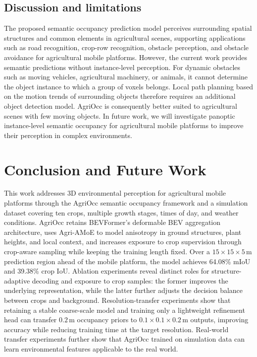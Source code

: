 \documentclass[a4paper,fleqn]{cas-sc}
\begin{document}
\subsection{Discussion and limitations}\label{sec:discussion}
The proposed semantic occupancy prediction model perceives surrounding spatial structures and common elements in agricultural scenes, supporting applications such as road recognition, crop-row recognition, obstacle perception, and obstacle avoidance for agricultural mobile platforms.
However, the current work provides semantic predictions without instance-level perception. For dynamic obstacles such as moving vehicles, agricultural machinery, or animals, it cannot determine the object instance to which a group of voxels belongs.
Local path planning based on the motion trends of surrounding objects therefore requires an additional object detection model.
AgriOcc is consequently better suited to agricultural scenes with few moving objects.
In future work, we will investigate panoptic instance-level semantic occupancy for agricultural mobile platforms to improve their perception in complex environments.

\section{Conclusion and Future Work}\label{sec:conclusion}
This work addresses 3D environmental perception for agricultural mobile platforms through the AgriOcc semantic occupancy framework and a simulation dataset covering ten crops, multiple growth stages, times of day, and weather conditions.
AgriOcc retains BEVFormer's deformable BEV aggregation architecture, uses Agri-AMoE to model anisotropy in ground structures, plant heights, and local context, and increases exposure to crop supervision through crop-aware sampling while keeping the training length fixed.
Over a $15\times15\times5\,\mathrm{m}$ prediction region ahead of the mobile platform, the model achieves 64.08\% mIoU and 39.38\% crop IoU.
Ablation experiments reveal distinct roles for structure-adaptive decoding and exposure to crop samples: the former improves the underlying representation, while the latter further adjusts the decision balance between crops and background.
Resolution-transfer experiments show that retaining a stable coarse-scale model and training only a lightweight refinement head can transfer $0.2\,\mathrm{m}$ occupancy priors to $0.1\times0.1\times0.2\,\mathrm{m}$ outputs, improving accuracy while reducing training time at the target resolution.
Real-world transfer experiments further show that AgriOcc trained on simulation data can learn environmental features applicable to the real world.
\end{document}
